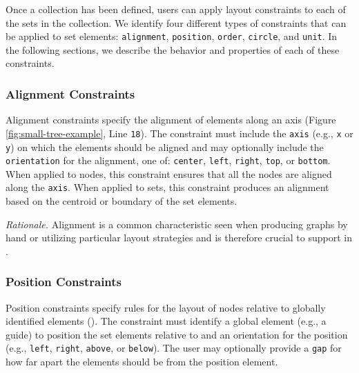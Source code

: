 \label{sec:constraints}
Once a collection has been defined, users can apply layout constraints to
each of the sets in the collection. We identify four different types of
constraints that can be applied to set elements: \texttt{alignment},
\texttt{position}, \texttt{order}, \texttt{circle}, and \texttt{unit}. In
the following sections, we describe the behavior and properties of each of
these constraints.


\subsubsection{Alignment Constraints}
 Alignment constraints
specify the alignment of elements along an axis (Figure
\ref{fig:small-tree-example}, Line \texttt{18}). The constraint must
include the \texttt{axis} (e.g., \texttt{x} or \texttt{y}) on which the
elements should be aligned and may optionally include the
\texttt{orientation} for the alignment, one of: \texttt{center},
\texttt{left}, \texttt{right}, \texttt{top}, or \texttt{bottom}. When
applied to nodes, this constraint ensures that all the nodes are aligned
along the \texttt{axis}. When applied to sets, this constraint produces an
alignment based on the centroid or boundary of the set elements.

\emph{Rationale.} Alignment is a common characteristic seen when producing
graphs by hand  or utilizing particular layout strategies
 and is therefore crucial to support in \projectname.


\subsubsection{Position Constraints}
 Position constraints specify rules for the layout
of nodes relative to globally identified elements (). The
constraint must identify a global element (e.g., a guide) to position the
set elements relative to and an orientation for the position (e.g.,
\texttt{left}, \texttt{right}, \texttt{above}, or \texttt{below}). The user
may optionally provide a \texttt{gap} for how far apart the elements should
be from the position element.

